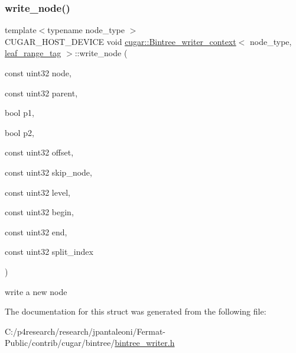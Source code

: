 \subsubsection{\texorpdfstring{write\+\_\+node()}{write\_node()}}
{\footnotesize\ttfamily template$<$typename node\+\_\+type $>$ \\
C\+U\+G\+A\+R\+\_\+\+H\+O\+S\+T\+\_\+\+D\+E\+V\+I\+CE void \hyperlink{structcugar_1_1_bintree__writer__context}{cugar\+::\+Bintree\+\_\+writer\+\_\+context}$<$ node\+\_\+type, \hyperlink{structcugar_1_1leaf__range__tag}{leaf\+\_\+range\+\_\+tag} $>$\+::write\+\_\+node (\begin{DoxyParamCaption}\item[{const uint32}]{node,  }\item[{const uint32}]{parent,  }\item[{bool}]{p1,  }\item[{bool}]{p2,  }\item[{const uint32}]{offset,  }\item[{const uint32}]{skip\+\_\+node,  }\item[{const uint32}]{level,  }\item[{const uint32}]{begin,  }\item[{const uint32}]{end,  }\item[{const uint32}]{split\+\_\+index }\end{DoxyParamCaption})\hspace{0.3cm}{\ttfamily [inline]}}

write a new node 

The documentation for this struct was generated from the following file\+:\begin{DoxyCompactItemize}
\item 
C\+:/p4research/research/jpantaleoni/\+Fermat-\/\+Public/contrib/cugar/bintree/\hyperlink{bintree__writer_8h}{bintree\+\_\+writer.\+h}\end{DoxyCompactItemize}
